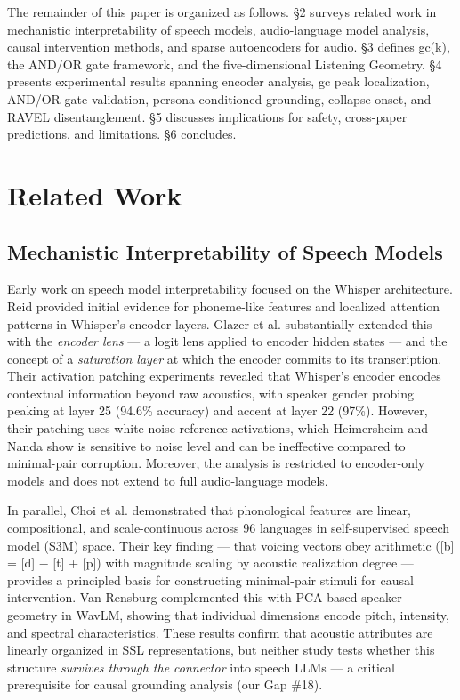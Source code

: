 \documentclass[a4paper]{article}
\begin{document}
The remainder of this paper is organized as follows. §2 surveys related work in mechanistic interpretability of speech models, audio-language model analysis, causal intervention methods, and sparse autoencoders for audio. §3 defines gc(k), the AND/OR gate framework, and the five-dimensional Listening Geometry. §4 presents experimental results spanning encoder analysis, gc peak localization, AND/OR gate validation, persona-conditioned grounding, collapse onset, and RAVEL disentanglement. §5 discusses implications for safety, cross-paper predictions, and limitations. §6 concludes.


\section{Related Work}

\subsection{Mechanistic Interpretability of Speech Models}

Early work on speech model interpretability focused on the Whisper architecture. Reid \cite{reid2023} provided initial evidence for phoneme-like features and localized attention patterns in Whisper's encoder layers. Glazer et al. \cite{glazer2025} substantially extended this with the \textit{encoder lens} — a logit lens applied to encoder hidden states — and the concept of a \textit{saturation layer} at which the encoder commits to its transcription. Their activation patching experiments revealed that Whisper's encoder encodes contextual information beyond raw acoustics, with speaker gender probing peaking at layer 25 (94.6\% accuracy) and accent at layer 22 (97\%). However, their patching uses white-noise reference activations, which Heimersheim and Nanda \cite{ref2024} show is sensitive to noise level and can be ineffective compared to minimal-pair corruption. Moreover, the analysis is restricted to encoder-only models and does not extend to full audio-language models.

In parallel, Choi et al. \cite{arxiv_2602.18899} demonstrated that phonological features are linear, compositional, and scale-continuous across 96 languages in self-supervised speech model (S3M) space. Their key finding — that voicing vectors obey arithmetic ([b] = [d] − [t] + [p]) with magnitude scaling by acoustic realization degree — provides a principled basis for constructing minimal-pair stimuli for causal intervention. Van Rensburg \cite{arxiv_2603.03096} complemented this with PCA-based speaker geometry in WavLM, showing that individual dimensions encode pitch, intensity, and spectral characteristics. These results confirm that acoustic attributes are linearly organized in SSL representations, but neither study tests whether this structure \textit{survives through the connector} into speech LLMs — a critical prerequisite for causal grounding analysis (our Gap \#18).
\end{document}
